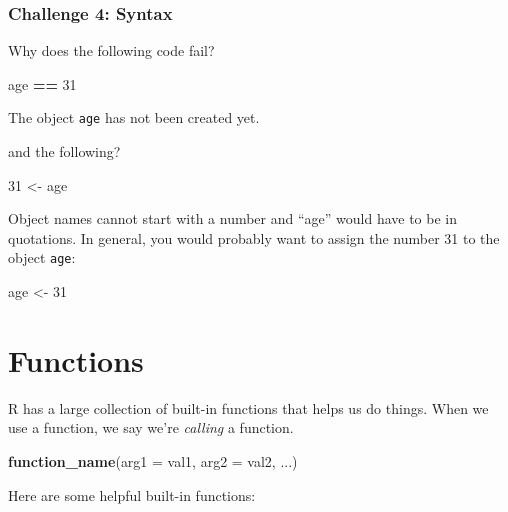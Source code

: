 \documentclass[]{book}
\newenvironment{Shaded}{\begin{snugshade}}{\end{snugshade}}
\newcommand{\KeywordTok}[1]{\textcolor[rgb]{0.13,0.29,0.53}{\textbf{#1}}}
\newcommand{\DataTypeTok}[1]{\textcolor[rgb]{0.13,0.29,0.53}{#1}}
\newcommand{\DecValTok}[1]{\textcolor[rgb]{0.00,0.00,0.81}{#1}}
\newcommand{\StringTok}[1]{\textcolor[rgb]{0.31,0.60,0.02}{#1}}
\newcommand{\OperatorTok}[1]{\textcolor[rgb]{0.81,0.36,0.00}{\textbf{#1}}}
\newcommand{\NormalTok}[1]{#1}
\begin{document}
\subsubsection*{Challenge 4: Syntax}\label{challenge-4-syntax}

Why does the following code fail?

\begin{Shaded}
\begin{Highlighting}[]
\NormalTok{age }\OperatorTok{==}\StringTok{ }\DecValTok{31}
\end{Highlighting}
\end{Shaded}

The object \texttt{age} has not been created yet.

and the following?

\begin{Shaded}
\begin{Highlighting}[]
\DecValTok{31}\NormalTok{ <-}\StringTok{  }\NormalTok{age}
\end{Highlighting}
\end{Shaded}

Object names cannot start with a number and ``age'' would have to be in
quotations. In general, you would probably want to assign the number 31
to the object \texttt{age}:

\begin{Shaded}
\begin{Highlighting}[]
\NormalTok{age <-}\StringTok{ }\DecValTok{31}
\end{Highlighting}
\end{Shaded}

\section{Functions}\label{functions}

R has a large collection of built-in functions that helps us do things.
When we use a function, we say we're \emph{calling} a function.

\begin{Shaded}
\begin{Highlighting}[]
\KeywordTok{function_name}\NormalTok{(}\DataTypeTok{arg1 =}\NormalTok{ val1, }\DataTypeTok{arg2 =}\NormalTok{ val2, ...)}
\end{Highlighting}
\end{Shaded}

Here are some helpful built-in functions:
\end{document}
